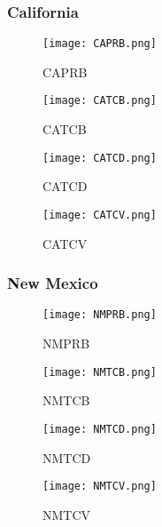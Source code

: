 \documentclass{mcmthesis}
\begin{document}
\subsubsection{California}
\begin{figure}[H]
\begin{minipage}[htb]{0.5\textwidth}
\centering
\texttt{[image: CAPRB.png]}
\caption{CAPRB} \label{fig:CAPRB}
\end{minipage}
\begin{minipage}[htb]{0.5\textwidth}
\centering
\texttt{[image: CATCB.png]}
\caption{CATCB} \label{fig:CATCB}
\end{minipage}
\end{figure}

\begin{figure}[H]
\begin{minipage}[htb]{0.5\textwidth}
\centering
\texttt{[image: CATCD.png]}
\caption{CATCD} \label{fig:CATCD}
\end{minipage}
\begin{minipage}[htb]{0.5\textwidth}
\centering
\texttt{[image: CATCV.png]}
\caption{CATCV} \label{fig:CATCV}
\end{minipage}
\end{figure}

\subsubsection{New Mexico}
\begin{figure}[H]
\begin{minipage}[htb]{0.5\textwidth}
\centering
\texttt{[image: NMPRB.png]}
\caption{NMPRB} \label{fig:NMPRB}
\end{minipage}
\begin{minipage}[htb]{0.5\textwidth}
\centering
\texttt{[image: NMTCB.png]}
\caption{NMTCB} \label{fig:NMTCB}
\end{minipage}
\end{figure}

\begin{figure}[H]
\begin{minipage}[htb]{0.5\textwidth}
\centering
\texttt{[image: NMTCD.png]}
\caption{NMTCD} \label{fig:NMTCD}
\end{minipage}
\begin{minipage}[htb]{0.5\textwidth}
\centering
\texttt{[image: NMTCV.png]}
\caption{NMTCV} \label{fig:NMTCV}
\end{minipage}
\end{figure}
\end{document}
